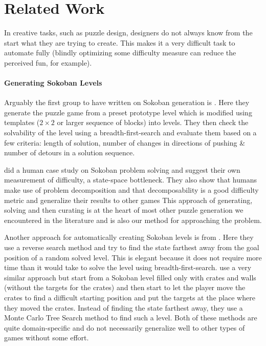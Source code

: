 
\setcounter{chapter}{1}

\chapter{Related Work}
In creative tasks, such as puzzle design, designers do not always know from the start what they are trying to create. This makes it a very difficult task to automate fully (blindly optimizing some difficulty measure can reduce the perceived fun, for example).

\subsubsection{Generating Sokoban Levels}

Arguably the first group to have written on Sokoban generation is \cite{Science1996}. Here they generate the puzzle game from a preset prototype level which is modified using templates ($2 \times 2$ or larger sequence of blocks) into levels. They then check the solvability of the level using a breadth-first-search and evaluate them based on a few criteria: length of solution, number of changes in directions of pushing \& number of detours in a solution sequence.

\cite{Pelanek2011} did a human case study on Sokoban problem solving and suggest their own measurement of difficulty, a state-space bottleneck. They also show that humans make use of problem decomposition and that decomposability is a good difficulty metric and generalize their results to other games \cite{Jaru} This approach of generating, solving and then curating is at the heart of most other puzzle generation we encountered in the literature and is also our method for approaching the problem.

Another approach for automatically creating Sokoban levels is from \cite{Taylor2011}. Here they use a reverse search method and try to find the state farthest away from the goal position of a random solved level. This is elegant because it does not require more time than it would take to solve the level using breadth-first-search. \cite{Kartal2015} use a very similar approach but start from a Sokoban level filled only with crates and walls (without the targets for the crates) and then start to let the player move the crates to find a difficult starting position and put the targets at the place where they moved the crates. Instead of finding the state farthest away, they use a Monte Carlo Tree Search method to find such a level. Both of these methods are quite domain-specific and do not necessarily generalize well to other types of games without some effort.

